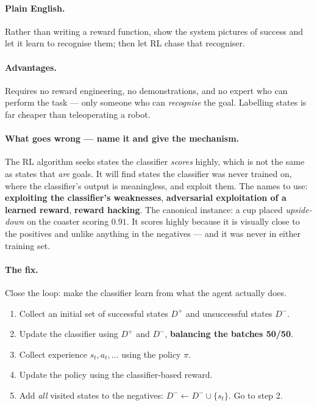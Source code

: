 \documentclass[11pt,a4paper]{article}
\begin{document}
\paragraph{Plain English.} Rather than writing a reward function, show the
system pictures of success and let it learn to recognise them; then let RL
chase that recogniser.

\paragraph{Advantages.} Requires no reward engineering, no demonstrations, and
no expert who can perform the task --- only someone who can \emph{recognise}
the goal. Labelling states is far cheaper than teleoperating a robot.

\paragraph{What goes wrong --- name it and give the mechanism.} The RL
algorithm seeks states the classifier \emph{scores} highly, which is not the
same as states that \emph{are} goals. It will find states the classifier was
never trained on, where the classifier's output is meaningless, and exploit
them. The names to use: \textbf{exploiting the classifier's weaknesses},
\textbf{adversarial exploitation of a learned reward}, \textbf{reward
hacking}. The canonical instance: a cup placed \emph{upside-down} on the
coaster scoring $0.91$. It scores highly because it is visually close to the
positives and unlike anything in the negatives --- and it was never in either
training set.

\paragraph{The fix.} Close the loop: make the classifier learn from what the
agent actually does.
\begin{enumerate}[label=\arabic*.]
\item Collect an initial set of successful states $D^+$ and unsuccessful
states $D^-$.
\item Update the classifier using $D^+$ and $D^-$, \textbf{balancing the
batches 50/50}.
\item Collect experience $s_t,a_t,\dots$ using the policy $\pi$.
\item Update the policy using the classifier-based reward.
\item Add \emph{all} visited states to the negatives:
$D^-\leftarrow D^-\cup\{s_t\}$. Go to step 2.
\end{enumerate}
\end{document}
